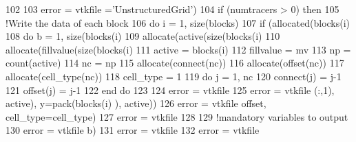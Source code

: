 \begin{DoxyCode}
102 
103     error = vtkfile%
      =\textcolor{stringliteral}{'UnstructuredGrid'})
104     \textcolor{keywordflow}{if} (numtracers > 0) \textcolor{keywordflow}{then}        
105         \textcolor{comment}{!Write the data of each block}
106         \textcolor{keywordflow}{do} i = 1, \textcolor{keyword}{size}(blocks)
107             \textcolor{keywordflow}{if} (\textcolor{keyword}{allocated}(blocks(i)%
108                 \textcolor{keywordflow}{do} b = 1, \textcolor{keyword}{size}(blocks(i)%
109                     \textcolor{keyword}{allocate}(active(\textcolor{keyword}{size}(blocks(i)%
110                     \textcolor{keyword}{allocate}(fillvalue(\textcolor{keyword}{size}(blocks(i)%
111                     active = blocks(i)%
112                     fillvalue = mv
113                     np = count(active)
114                     nc = np
115                     \textcolor{keyword}{allocate}(connect(nc))
116                     \textcolor{keyword}{allocate}(offset(nc))
117                     \textcolor{keyword}{allocate}(cell\_type(nc))
118                     cell\_type = 1
119                     \textcolor{keywordflow}{do} j = 1, nc
120                         connect(j) = j-1
121                         offset(j) = j-1
122 \textcolor{keywordflow}{                    end do}
123 
124                     error = vtkfile%
125                     error = vtkfile%
      (:,1), active), y=pack(blocks(i)%
      ), active))
126                     error = vtkfile%
      offset, cell\_type=cell\_type)
127                     error = vtkfile%
128 
129                     \textcolor{comment}{!mandatory variables to output}
130                     error = vtkfile%
      b)%
131                     error = vtkfile%
132                     error = vtkfile%

\end{DoxyCode}
